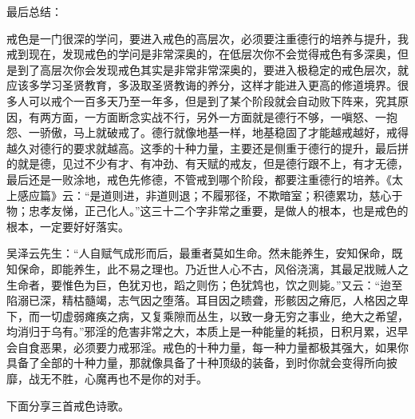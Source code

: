 最后总结：

戒色是一门很深的学问，要进入戒色的高层次，必须要注重德行的培养与提升，我戒到现在，发现戒色的学问是非常深奥的，在低层次你不会觉得戒色有多深奥，但是到了高层次你会发现戒色其实是非常非常深奥的，要进入极稳定的戒色层次，就应该多学习圣贤教育，多汲取圣贤教诲的养分，这样才能进入更高的修道境界。很多人可以戒个一百多天乃至一年多，但是到了某个阶段就会自动败下阵来，究其原因，有两方面，一方面断念实战不行，另外一方面就是德行不够，一嗔怒、一抱怨、一骄傲，马上就破戒了。德行就像地基一样，地基稳固了才能越戒越好，戒得越久对德行的要求就越高。这季的十种力量，主要还是侧重于德行的提升，最后拼的就是德，见过不少有才、有冲劲、有天赋的戒友，但是德行跟不上，有才无德，最后还是一败涂地，戒色先修德，不管戒到哪个阶段，都要注重德行的培养。《太上感应篇》云：“是道则进，非道则退；不履邪径，不欺暗室；积德累功，慈心于物；忠孝友悌，正己化人。”这三十二个字非常之重要，是做人的根本，也是戒色的根本，一定要好好落实。

吴泽云先生：“人自赋气成形而后，最重者莫如生命。然未能养生，安知保命，既知保命，即能养生，此不易之理也。乃近世人心不古，风俗浇漓，其最足戕贼人之生命者，要惟色为巨，色犹刃也，蹈之则伤；色犹鸩也，饮之则毙。”又云：“迨至陷溺已深，精枯髓竭，志气因之堕落。耳目因之瞆聋，形骸因之瘠厄，人格因之卑下，而一切虚弱瘫痪之病，又复乘隙而丛生，以致一身无穷之事业，绝大之希望，均消归于乌有。”邪淫的危害非常之大，本质上是一种能量的耗损，日积月累，迟早会自食恶果，必须要力戒邪淫。戒色的十种力量，每一种力量都极其强大，如果你具备了全部的十种力量，那就像具备了十种顶级的装备，到时你就会变得所向披靡，战无不胜，心魔再也不是你的对手。

下面分享三首戒色诗歌。

